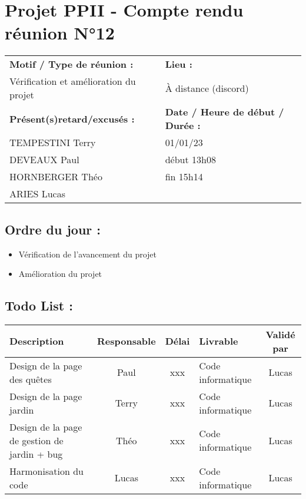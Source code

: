 \documentclass{article}
\begin{document}
\section*{Projet PPII - Compte rendu réunion N°12}
\begin{tabular}{|p{7cm}|p{6cm}|}
    \hline
    \textbf{Motif / Type de réunion :}
    & \textbf{Lieu :}
    \\
    Vérification et amélioration du projet
    & 
    À distance (discord)
    \\ \hline
    \textbf{Présent(s)retard/excusés :}
    &
    \textbf{Date / Heure de début / Durée :}
    \\ 
    TEMPESTINI Terry &  01/01/23\\  
    DEVEAUX Paul & début 13h08\\
    HORNBERGER Théo & fin 15h14\\
    ARIES Lucas & 
    \\ \hline
\end{tabular}

\subsection*{Ordre du jour :}
\begin{itemize}
    \item{Vérification de l'avancement du projet}
    \item{Amélioration du projet}
\end{itemize}

\subsection*{Todo List :}
\begin{tabular}{|p{3.5cm}|c|c|p{4.5cm}|c|}
    \hline 
    Description & Responsable & Délai & Livrable & Validé par 
    \\ \hline
    Design de la page des quêtes & Paul & xxx & Code informatique & Lucas \\ \hline
    Design de la page jardin & Terry & xxx & Code informatique & Lucas \\ \hline
    Design de la page de gestion de jardin + bug & Théo & xxx & Code informatique & Lucas \\ \hline
    Harmonisation du code & Lucas & xxx & Code informatique & Lucas \\ \hline
\end{tabular}
\end{document}

